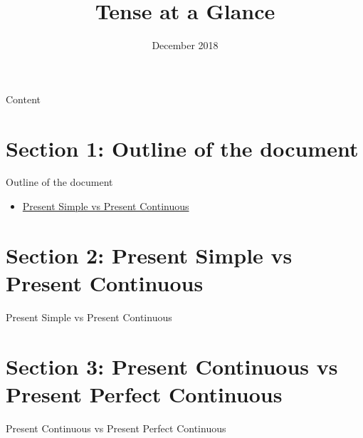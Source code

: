 \documentclass{beamer}
\title{Tense at a Glance}
\date{December 2018}
\begin{document}
\begin{frame}
\maketitle
\end{frame}
\begin{frame}{Content}
\tableofcontents
\end{frame}
\section{Section 1: Outline of the document}
\begin{frame}{Outline of the document}
\begin{itemize}
    \item \hyperlink{foo}{Present Simple vs Present Continuous}

\end{itemize}
\end{frame}
\section{Section 2: Present Simple vs Present Continuous}
\begin{frame}[label=foo]{Present Simple vs Present Continuous}


\end{frame}

\section{Section 3: Present Continuous vs Present Perfect Continuous }
\begin{frame}[label=bar]{Present Continuous vs Present Perfect Continuous}

\end{frame}
\end{document}

